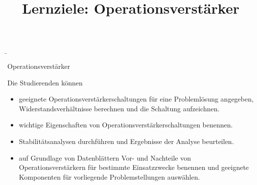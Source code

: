 \begin{frame}
    \b{
        \begin{Lernziele}{Operationsverstärker}
            \title{Lernziele: Operationsverstärker}
            Die Studierenden können
            \begin{itemize}
                \item geeignete Operationsverstärkerschaltungen für eine Problemlösung angegeben, Widerstandsverhältnisse berechnen und die Schaltung aufzeichnen.
                \item wichtige Eigenschaften von Operationsverstärkerschaltungen benennen.
                \item Stabilitätsanalysen durchführen und Ergebnisse der Analyse beurteilen.
                \item auf Grundlage von Datenblättern Vor- und Nachteile von Operationsverstärkern für bestimmte Einsatzzwecke benennen und geeignete Komponenten für vorliegende Problemstellungen auswählen.
            \end{itemize}
        \end{Lernziele}
    }
\end{frame}



